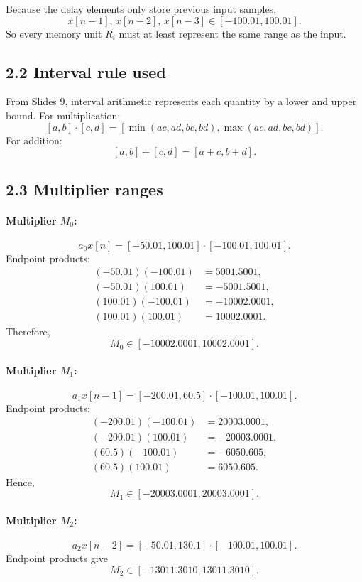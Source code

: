 \documentclass[11pt,a4paper]{article}
\begin{document}
Because the delay elements only store previous input samples,
\[
x[n-1],\,x[n-2],\,x[n-3]\in[-100.01,100.01].
\]
So every memory unit $R_i$ must at least represent the same range as the input.

\subsection*{2.2 Interval rule used}
From Slides 9, interval arithmetic represents each quantity by a lower and upper bound. For multiplication:
\[
[a,b]\cdot[c,d]=[\min(ac,ad,bc,bd),\max(ac,ad,bc,bd)].
\]
For addition:
\[
[a,b]+[c,d]=[a+c,b+d].
\]

\subsection*{2.3 Multiplier ranges}
\paragraph{Multiplier $M_0$:}
\[
a_0x[n]=[-50.01,100.01]\cdot[-100.01,100.01].
\]
Endpoint products:
\[
\begin{aligned}
(-50.01)(-100.01)&=5001.5001,\\
(-50.01)(100.01)&=-5001.5001,\\
(100.01)(-100.01)&=-10002.0001,\\
(100.01)(100.01)&=10002.0001.
\end{aligned}
\]
Therefore,
\[
M_0\in[-10002.0001,10002.0001].
\]

\paragraph{Multiplier $M_1$:}
\[
a_1x[n-1]=[-200.01,60.5]\cdot[-100.01,100.01].
\]
Endpoint products:
\[
\begin{aligned}
(-200.01)(-100.01)&=20003.0001,\\
(-200.01)(100.01)&=-20003.0001,\\
(60.5)(-100.01)&=-6050.605,\\
(60.5)(100.01)&=6050.605.
\end{aligned}
\]
Hence,
\[
M_1\in[-20003.0001,20003.0001].
\]

\paragraph{Multiplier $M_2$:}
\[
a_2x[n-2]=[-50.01,130.1]\cdot[-100.01,100.01].
\]
Endpoint products give
\[
M_2\in[-13011.3010,13011.3010].
\]
\end{document}
